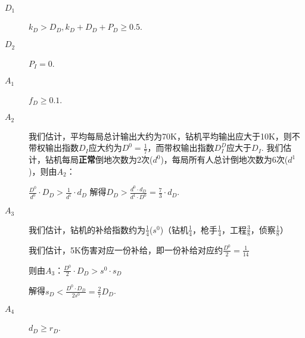 \documentclass{ctexart}
\begin{document}
\begin{description}
    \item[$D_1$] $k_D > D_D, k_D + D_D + P_D \ge 0.5$.
    \item[$D_2$] $P_I = 0$.
    \item[$A_1$] $f_D \ge 0.1$.
    \item[$A_2$]  我们估计，平均每局总计输出大约为70K，钻机平均输出应大于10K，则不带权输出指数$D_I$应大约为$D^0 = \frac{1}{7}$，而带权输出指数$D^D_I$应大于$D_I$. 我们估计，钻机每局\textbf{正常}倒地次数为2次($d^0$)，每局所有人总计倒地次数为6次($d^1$)，则由$A_2$：

          $\frac{D^0}{d^0} \cdot D_D> \frac{1}{d^1} \cdot d_D$
          解得$D_D > \frac{d^0 \cdot d_D}{d^1 \cdot D^0} = \frac{7}{3} \cdot d_D$.
    \item[$A_3$] 我们估计，钻机的补给指数约为$\frac{1}{4}$($s^0$)（钻机$\frac{1}{4}$，枪手$\frac{1}{4}$，工程$\frac{3}{8}$，侦察$\frac{1}{8}$）

          我们估计，5K伤害对应一份补给，即一份补给对应约$\frac{D^0}{2} = \frac{1}{14}$

          则由$A_3$：$\frac{D^0}{2} \cdot D_D > s^0 \cdot s_D$

          解得$s_D < \frac{D^0 \cdot D_D}{2 s^0} = \frac{2}{7} D_D$.

    \item[$A_4$] $d_D \ge r_D$.
\end{description}
\end{document}
